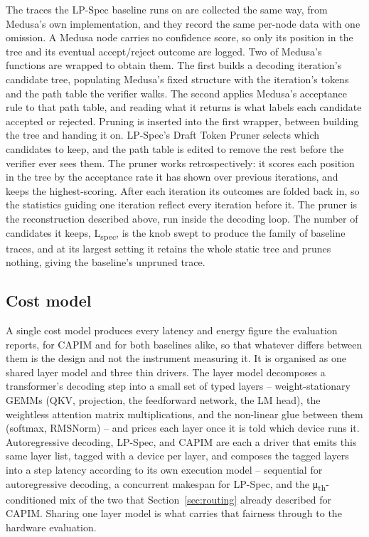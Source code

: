 \documentclass[11pt]{article}
\begin{document}
The traces the LP-Spec baseline runs on are collected the same way, from Medusa's own implementation, and they record the same per-node data with one omission. A Medusa node carries no confidence score, so only its position in the tree and its eventual accept/reject outcome are logged. Two of Medusa's functions are wrapped to obtain them. The first builds a decoding iteration's candidate tree, populating Medusa's fixed structure with the iteration's tokens and the path table the verifier walks. The second applies Medusa's acceptance rule to that path table, and reading what it returns is what labels each candidate accepted or rejected. Pruning is inserted into the first wrapper, between building the tree and handing it on. LP-Spec's Draft Token Pruner selects which candidates to keep, and the path table is edited to remove the rest before the verifier ever sees them. The pruner works retrospectively: it scores each position in the tree by the acceptance rate it has shown over previous iterations, and keeps the highest-scoring. After each iteration its outcomes are folded back in, so the statistics guiding one iteration reflect every iteration before it. The pruner is the reconstruction described above, run inside the decoding loop. The number of candidates it keeps, L\textsubscript{spec}, is the knob swept to produce the family of baseline traces, and at its largest setting it retains the whole static tree and prunes nothing, giving the baseline's unpruned trace.

\subsection{Cost model}
\label{sec:costmodel}
A single cost model produces every latency and energy figure the evaluation reports, for CAPIM and for both baselines alike, so that whatever differs between them is the design and not the instrument measuring it. It is organised as one shared layer model and three thin drivers. The layer model decomposes a transformer's decoding step into a small set of typed layers -- weight-stationary GEMMs (QKV, projection, the feedforward network, the LM head), the weightless attention matrix multiplications, and the non-linear glue between them (softmax, RMSNorm) -- and prices each layer once it is told which device runs it. Autoregressive decoding, LP-Spec, and CAPIM are each a driver that emits this same layer list, tagged with a device per layer, and composes the tagged layers into a step latency according to its own execution model -- sequential for autoregressive decoding, a concurrent makespan for LP-Spec, and the μ\textsubscript{th}-conditioned mix of the two that Section~\ref{sec:routing} already described for CAPIM. Sharing one layer model is what carries that fairness through to the hardware evaluation.
\end{document}
